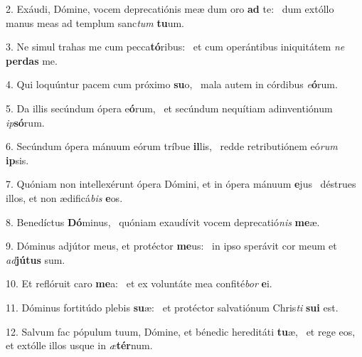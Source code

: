 2. Exáudi, Dómine, vocem deprecatiónis meæ dum oro \textbf{ad} te: \ast\  dum extóllo manus meas ad templum sanc\textit{tum} \textbf{tu}um.\

3. Ne simul trahas me cum pecca\textbf{tó}ribus: \ast\  et cum operántibus iniquitátem \textit{ne} \textbf{per}\textbf{das} me.\

4. Qui loquúntur pacem cum próximo \textbf{su}o, \ast\  mala autem in córdibus \textit{e}\textbf{ó}rum.\

5. Da illis secúndum ópera e\textbf{ó}rum, \ast\  et secúndum nequítiam adinventiónum \textit{ip}\textbf{só}rum.\

6. Secúndum ópera mánuum eórum tríbue \textbf{il}lis, \ast\  redde retributiónem eó\textit{rum} \textbf{ip}sis.\

7. Quóniam non intellexérunt ópera Dómini, et in ópera mánuum \textbf{e}jus \ast\  déstrues illos, et non ædificá\textit{bis} \textbf{e}os.\

8. Benedíctus \textbf{Dó}minus, \ast\  quóniam exaudívit vocem deprecatió\textit{nis} \textbf{me}æ.\

9. Dóminus adjútor meus, et protéctor \textbf{me}us: \ast\  in ipso sperávit cor meum et \textit{ad}\textbf{jú}\textbf{tus} sum.\

10. Et reflóruit caro \textbf{me}a: \ast\  et ex voluntáte mea confité\textit{bor} \textbf{e}i.\

11. Dóminus fortitúdo plebis \textbf{su}æ: \ast\  et protéctor salvatiónum Chris\textit{ti} \textbf{su}\textbf{i} est.\

12. Salvum fac pópulum tuum, Dómine, et bénedic hereditáti \textbf{tu}æ, \ast\  et rege eos, et extólle illos usque in \textit{æ}\textbf{tér}num.\

